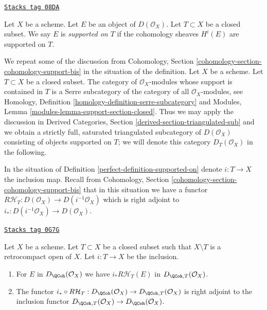 \begin{definition}[Supported on]
\label{perfect-definition-supported-on}
\href{https://stacks.math.columbia.edu/tag/08DA}{\texttt{Stacks tag 08DA}}

Let $X$ be a scheme. Let $E$ be an object of $D(\mathcal{O}_X)$.
Let $T \subset X$ be a closed subset.
We say $E$ is {\it supported on $T$} if the
cohomology sheaves $H^i(E)$ are supported on $T$.
\end{definition}

We repeat some of the discussion from
Cohomology, Section \ref{cohomology-section-cohomology-support-bis}
in the situation of the definition.
Let $X$ be a scheme. Let $T \subset X$ be a closed subset.
The category of $\mathcal{O}_X$-modules whose
support is contained in $T$ is a Serre subcategory of the
category of all $\mathcal{O}_X$-modules, see
Homology, Definition \ref{homology-definition-serre-subcategory}
and
Modules, Lemma \ref{modules-lemma-support-section-closed}.
Thus we may apply the discussion in
Derived Categories, Section \ref{derived-section-triangulated-sub}
and we obtain a strictly full, saturated triangulated subcategory of
$D(\mathcal{O}_X)$ consisting of objects supported on $T$; we will
denote this category $D_T(\mathcal{O}_X)$ in the following.

\medskip\noindent
In the situation of Definition \ref{perfect-definition-supported-on}
denote $i : T \to X$ the inclusion map. Recall from
Cohomology, Section \ref{cohomology-section-cohomology-support-bis}
that in this situation we have a functor
$R\mathcal{H}_T : D(\mathcal{O}_X) \to D(i^{-1}\mathcal{O}_X)$
which is right adjoint to $i_* : D(i^{-1}\mathcal{O}_X) \to D(\mathcal{O}_X)$.

\begin{lemma}
\label{perfect-lemma-support-quasi-coherent}
\href{https://stacks.math.columbia.edu/tag/0G7G}{\texttt{Stacks tag 0G7G}}

Let $X$ be a scheme. Let $T \subset X$ be a closed subset such that
$X \setminus T$ is a retrocompact open of $X$. Let $i : T \to X$ be
the inclusion.
\begin{enumerate}
\item For $E$ in $D_\QCoh(\mathcal{O}_X)$ we have
$i_*R\mathcal{H}_T(E)$ in $D_{\QCoh, T}(\mathcal{O}_X)$.
\item The functor
$i_* \circ R\mathcal{H}_T : D_\QCoh(\mathcal{O}_X) \to
D_{\QCoh, T}(\mathcal{O}_X)$ is right adjoint to the inclusion functor
$D_{\QCoh, T}(\mathcal{O}_X) \to D_\QCoh(\mathcal{O}_X)$.
\end{enumerate}
\end{lemma}

